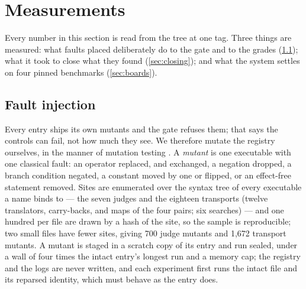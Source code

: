 
\section{Measurements}
\label{sec:measurements}

Every number in this section is read from the tree at one tag. Three
things are measured: what faults placed deliberately do to the gate
and to the grades (\cref{sec:faults}); what it took to close what
they found (\cref{sec:closing}); and what the system settles on four
pinned benchmarks (\cref{sec:boards}).

\subsection{Fault injection}
\label{sec:faults}

Every entry ships its own mutants and the gate refuses them; that
says the controls can fail, not how much they see. We therefore
mutate the registry ourselves, in the manner of mutation testing
\citep{demillo1978hints,jia2011mutation}. A \emph{mutant} is one
executable with one classical fault: an operator replaced, 
and  exchanged, a negation dropped, a branch condition
negated, a constant moved by one or flipped, or an effect-free
statement removed. Sites are enumerated over the syntax tree of
every executable a name binds to --- the seven judges and the
eighteen transports (twelve translators, carry-backs, and maps of the
four pairs; six searches) --- and one hundred per file are drawn by a
hash of the site, so the sample is reproducible; two small files have
fewer sites, giving 700 judge mutants and 1,672 transport mutants. A
mutant is staged in a scratch copy of its entry and run sealed, under
a wall of four times the intact entry's longest run and a memory cap;
the registry and the logs are never written, and each experiment
first runs the intact file and its reparsed identity, which must
behave as the entry does.

